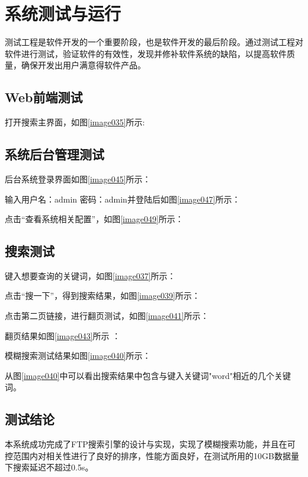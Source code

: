 
\chapter{系统测试与运行}
测试工程是软件开发的一个重要阶段，也是软件开发的最后阶段。通过测试工程对软件进行测试，验证软件的有效性，发现并修补软件系统的缺陷，以提高软件质量，确保开发出用户满意得软件产品。
\section{Web前端测试}
打开搜索主界面，如图\ref{image035}所示:


\section{系统后台管理测试}
后台系统登录界面如图\ref{image045}所示：
\newpage
{}

输入用户名：admin 密码：admin并登陆后如图\ref{image047}所示：

\newpage
点击“查看系统相关配置”，如图\ref{image049}所示：


\section{搜索测试}
键入想要查询的关键词，如图\ref{image037}所示：

\newpage
点击“搜一下”，得到搜索结果，如图\ref{image039}所示：


点击第二页链接，进行翻页测试，如图\ref{image041}所示：


翻页结果如图\ref{image043}所示 ：


模糊搜索测试结果如图\ref{image040}所示：


从图\ref{image040}中可以看出搜索结果中包含与键入关键词"word"相近的几个关键词。

\section{测试结论}
本系统成功完成了FTP搜索引擎的设计与实现，实现了模糊搜索功能，并且在可控范围内对相关性进行了良好的排序，性能方面良好，在测试所用的10GB数据量下搜索延迟不超过0.5s。




